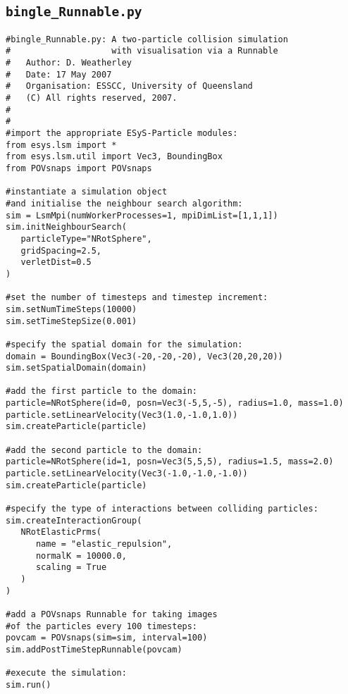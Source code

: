 \subsection{\texttt{bingle\_Runnable.py}}\label{code:bingle_Runnable}

\begin{verbatim}
#bingle_Runnable.py: A two-particle collision simulation 
#                    with visualisation via a Runnable 
#	Author: D. Weatherley
#	Date: 17 May 2007
#	Organisation: ESSCC, University of Queensland
#	(C) All rights reserved, 2007.
#
#
#import the appropriate ESyS-Particle modules:
from esys.lsm import *
from esys.lsm.util import Vec3, BoundingBox
from POVsnaps import POVsnaps

#instantiate a simulation object 
#and initialise the neighbour search algorithm:
sim = LsmMpi(numWorkerProcesses=1, mpiDimList=[1,1,1])
sim.initNeighbourSearch(
   particleType="NRotSphere",
   gridSpacing=2.5,
   verletDist=0.5
)

#set the number of timesteps and timestep increment:
sim.setNumTimeSteps(10000)
sim.setTimeStepSize(0.001)

#specify the spatial domain for the simulation:
domain = BoundingBox(Vec3(-20,-20,-20), Vec3(20,20,20))
sim.setSpatialDomain(domain)

#add the first particle to the domain:
particle=NRotSphere(id=0, posn=Vec3(-5,5,-5), radius=1.0, mass=1.0)
particle.setLinearVelocity(Vec3(1.0,-1.0,1.0))
sim.createParticle(particle)

#add the second particle to the domain:
particle=NRotSphere(id=1, posn=Vec3(5,5,5), radius=1.5, mass=2.0)
particle.setLinearVelocity(Vec3(-1.0,-1.0,-1.0))
sim.createParticle(particle)

#specify the type of interactions between colliding particles:
sim.createInteractionGroup(
   NRotElasticPrms(
      name = "elastic_repulsion",
      normalK = 10000.0,
      scaling = True
   )
)

#add a POVsnaps Runnable for taking images 
#of the particles every 100 timesteps:
povcam = POVsnaps(sim=sim, interval=100)
sim.addPostTimeStepRunnable(povcam)

#execute the simulation:
sim.run()
\end{verbatim}

